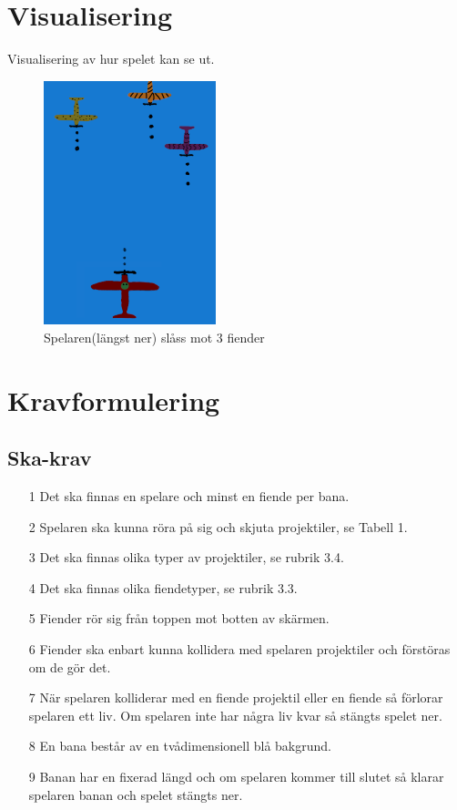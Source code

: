 \documentclass{TDP005mall}
\begin{document}
\section{Visualisering}
Visualisering av hur spelet kan se ut.
\begin{figure}[H]
  \centering
  \includegraphics[width=5cm]{Dogeater.png}
  \caption{Spelaren(längst ner) slåss mot 3 fiender}
\end{figure}

\section{Kravformulering}
\subsection{Ska-krav}
\begin{enumerate}
  \item [1] Det ska finnas en spelare och minst en fiende per bana.
  \item [2] Spelaren ska kunna röra på sig och skjuta projektiler, se Tabell 1.
  \item [3] Det ska finnas olika typer av projektiler, se rubrik 3.4.
  \item [4] Det ska finnas olika fiendetyper, se rubrik 3.3. 
  \item [5] Fiender rör sig från toppen mot botten av skärmen.
  \item [6] Fiender ska enbart kunna kollidera med spelaren projektiler och förstöras om de gör det.
  \item [7] När spelaren kolliderar med en fiende projektil eller en fiende så förlorar spelaren ett liv.
            Om spelaren inte har några liv kvar så stängts spelet ner.
  \item [8] En bana består av en tvådimensionell blå bakgrund.
  \item [9] Banan har en fixerad längd och om spelaren kommer till slutet så klarar spelaren banan och spelet stängts ner.
\end{enumerate}
\end{document}
